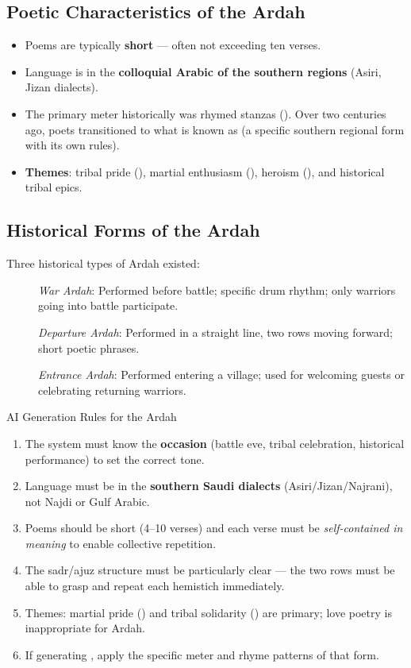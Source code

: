 \subsection{Poetic Characteristics of the Ardah}

\begin{itemize}
  \item Poems are typically \textbf{short} — often not exceeding ten verses.
  \item Language is in the \textbf{colloquial Arabic of the southern regions} (Asiri, Jizan dialects).
  \item The primary meter historically was rhymed stanzas (). Over two centuries ago, poets transitioned to what is known as  (a specific southern regional form with its own rules).
  \item \textbf{Themes}: tribal pride (), martial enthusiasm (), heroism (), and historical tribal epics.
\end{itemize}

\subsection{Historical Forms of the Ardah}

Three historical types of Ardah existed:
\begin{description}
  \item[] \textit{War Ardah}: Performed before battle; specific drum rhythm; only warriors going into battle participate.
  \item[] \textit{Departure Ardah}: Performed in a straight line, two rows moving forward; short poetic phrases.
  \item[] \textit{Entrance Ardah}: Performed entering a village; used for welcoming guests or celebrating returning warriors.
\end{description}

\begin{rulebox}{AI Generation Rules for the Ardah}
\begin{enumerate}
  \item The system must know the \textbf{occasion} (battle eve, tribal celebration, historical performance) to set the correct tone.
  \item Language must be in the \textbf{southern Saudi dialects} (Asiri/Jizan/Najrani), not Najdi or Gulf Arabic.
  \item Poems should be short (4–10 verses) and each verse must be \textit{self-contained in meaning} to enable collective repetition.
  \item The sadr/ajuz structure must be particularly clear — the two rows must be able to grasp and repeat each hemistich immediately.
  \item Themes: martial pride () and tribal solidarity () are primary; love poetry is inappropriate for Ardah.
  \item If generating , apply the specific meter and rhyme patterns of that form.
\end{enumerate}
\end{rulebox}

